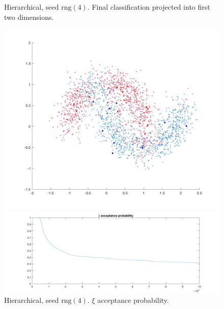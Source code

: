 \documentclass{siamart1116}
\begin{document}
\begin{figure}[!htb]
\begin{minipage}{0.48\textwidth}
    \centering
    \caption{\label{fig:moons_hier2_scatter} Hierarchical, seed $\text{rng}(4)$. Final classification projected into first two dimensions.}
    \includegraphics[width=\linewidth]{moons/hier2/scatter.png}
\end{minipage} \hfill
\begin{minipage}{0.48\textwidth}
    \centering
    \caption{\label{fig:moons_hier2_u_accept} Hierarchical, seed $\text{rng}(4)$. $\xi$ acceptance probability.}
    \includegraphics[width=\linewidth]{moons/hier2/xi_accept.png}
\end{minipage}
\end{figure}
\end{document}
